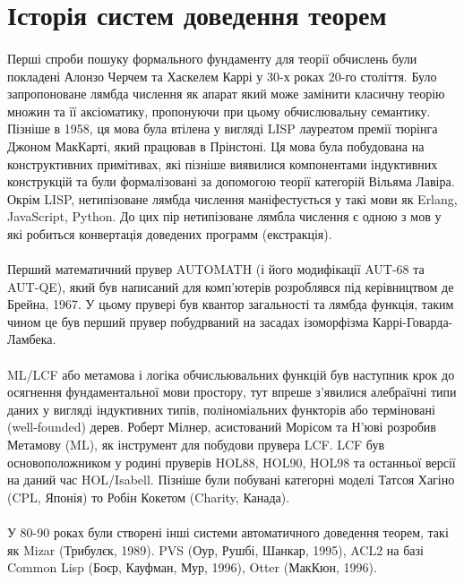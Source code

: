 \section{Історія систем доведення теорем}

\paragraph{}
Перші спроби пошуку формального фундаменту для теорії обчислень були покладені
Алонзо Черчем та Хаскелем Каррі у 30-х роках 20-го століття. Було запропоноване
лямбда числення як апарат який може замінити класичну теорію множин та її аксіоматику,
пропонуючи при цьому обчислювальну семантику. Пізніше в 1958, ця мова була втілена
у вигляді LISP лауреатом премії тюрінга Джоном МакКарті, який працював в Прінстоні.
Ця мова була побудована на конструктивних примітивах, які пізніше виявилися компонентами
індуктивних конструкцій та були формалізовані за допомогою
теорії категорій Вільяма Лавіра. Окрім LISP, нетипізоване лямбда числення
маніфестується у такі мови як Erlang, JavaScript, Python.
До цих пір нетипізоване лямбла числення є одною з мов у які робиться
конвертація доведених программ (екстракція).

\paragraph{}
Перший математичний прувер AUTOMATH (і його модифікації AUT-68 та AUT-QE),
який був написаний для комп'ютерів розроблявся під керівництвом де Брейна, 1967.
У цьому прувері був квантор загальності та лямбда функція, таким чином це був перший прувер
побудрваний на засадах ізоморфізма Каррі-Говарда-Ламбека.

\paragraph{}
ML/LCF або метамова і логіка обчисльювальних функцій був наступник крок до
осягнення фундаментальної мови простору, тут впреше з'явилися алебраїчні типи даних
у вигляді індуктивних типів, поліноміальних функторів або терміновані (well-founded) дерев.
Роберт Мілнер, асистований Морісом та Н'юві розробив Метамову (ML), як
інструмент для побудови прувера LCF. LCF був основоположником у родині пруверів
HOL88, HOL90, HOL98 та останньої версії на даний час HOL/Isabell.
Пізніше були побувані категорні моделі Татсоя Хагіно (CPL, Японія)
то Робін Кокетом (Charity, Канада).

\paragraph{}
У 80-90 роках були створені інші системи автоматичного доведення теорем,
такі як Mizar (Трибулєк, 1989). PVS (Оур, Рушбі, Шанкар, 1995),
ACL2 на базі Common Lisp (Боєр, Кауфман, Мур, 1996), Otter (МакКюн, 1996).

